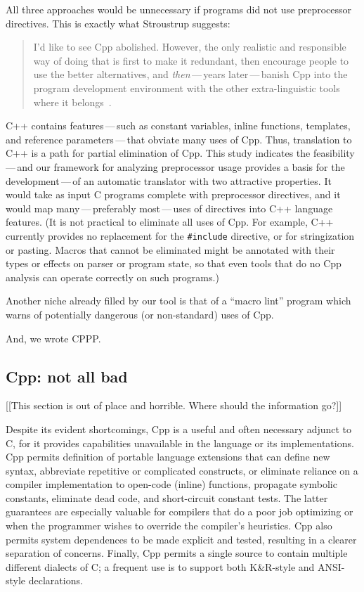 \documentclass[10pt]{article}
\begin{document}
All three approaches would be unnecessary if programs did not use
preprocessor directives.  This is exactly what Stroustrup suggests:
\begin{quote}
  I'd like to see Cpp abolished.  However, the only realistic and
  responsible way of doing that is first to make it redundant, then
  encourage people to use the better alternatives, and {\em then\/}\,---\,years
  later\,---\,banish Cpp into the program development environment with the
  other extra-linguistic tools where it
  belongs~\cite[p.~426]{Stroustrup-DesignEvolution}.
\end{quote}
C++ contains features\,---\,such as constant variables, inline functions,
templates, and reference parameters\,---\,that obviate many uses of Cpp.
Thus, translation to C++ is a path for partial elimination of Cpp.
This study indicates the
feasibility\,---\,and our framework for analyzing preprocessor usage
provides a basis for the development\,---\,of an automatic translator with
two attractive properties.  It would take as input C programs complete with
preprocessor directives, and it would map many\,---\,preferably
most\,---\,uses of directives into C++ language features.  (It is not
practical to eliminate all uses of Cpp.  For example, C++ currently
provides no replacement for the {\tt \#include} directive, or for
stringization or pasting.  Macros that cannot be eliminated might be
annotated with their types or 
effects on parser or program state, so that even tools that do no Cpp
analysis can operate correctly on such programs.)

Another niche already filled by our tool is that of a ``macro lint''
program which warns of potentially dangerous (or non-standard) uses of Cpp.

And, we wrote CPPP.



\subsection{Cpp: not all bad}

[[This section is out of place and horrible.  Where should the information
go?]]

Despite its evident shortcomings, Cpp is a useful and often necessary
adjunct to C, for it provides capabilities unavailable in the language or
its implementations.  Cpp permits definition of portable language
extensions that can define new syntax, abbreviate repetitive or complicated
constructs, or eliminate reliance on a compiler implementation to
open-code (inline) functions, propagate symbolic constants, eliminate dead
code, and short-circuit constant tests.  The latter guarantees are
especially valuable for compilers that do a poor job optimizing or when the
programmer wishes to override the compiler's heuristics.  Cpp also permits
system dependences to be made explicit and tested, resulting in a clearer
separation of concerns.  Finally, Cpp permits a single source to contain
multiple different dialects of C; a frequent use is to support both
K\&R-style and ANSI-style declarations.
\end{document}
